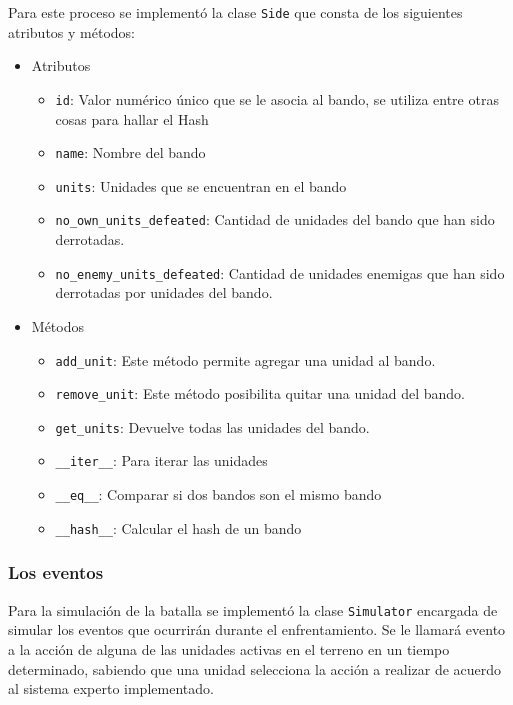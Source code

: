 Para este proceso se implement\'o la clase \verb|Side| que consta de los siguientes atributos y m\'etodos:
\begin{itemize}
\item Atributos
\begin{itemize}
\item \verb|id|: Valor num\'erico \'unico que se le asocia al bando, se utiliza entre otras cosas para hallar el Hash

\item \verb|name|: Nombre del bando

\item \verb|units|: Unidades que se encuentran en el bando

\item \verb|no_own_units_defeated|: Cantidad de unidades del bando que han sido derrotadas.

\item \verb|no_enemy_units_defeated|: Cantidad de unidades enemigas que han sido derrotadas por unidades del bando.

\end{itemize}

\item M\'etodos 
\begin{itemize}
\item \verb|add_unit|: Este m\'etodo permite agregar una unidad al bando.

\item \verb|remove_unit|: Este m\'etodo posibilita quitar una unidad del bando.

\item \verb|get_units|: Devuelve todas las unidades del bando.

\item \verb|__iter__|: Para iterar las unidades

\item \verb|__eq__|: Comparar si dos bandos son el mismo bando

\item \verb|__hash__|: Calcular el hash de un bando
\end{itemize}
\end{itemize}

\subsubsection{Los eventos}

Para la simulaci\'on de la batalla se implement\'o la clase \verb|Simulator|  encargada de simular los eventos que ocurrir\'an durante el enfrentamiento. Se le llamar\'a evento a la acci\'on de alguna de las unidades activas en el terreno en un tiempo determinado, sabiendo que una unidad selecciona la acci\'on a realizar de acuerdo al sistema experto implementado.


